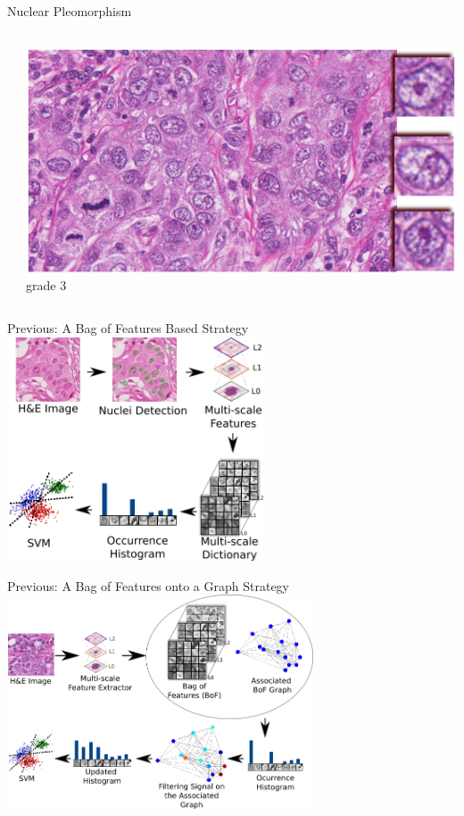 \documentclass[usenames,dvipsnames]{beamer}
\begin{document}
\begin{frame}{Nuclear Pleomorphism}
{\begin{columns}
\begin{column}{0.33\textwidth}
\end{column}

\begin{column}{0.33\textwidth}
\includegraphics[width=\textwidth]{imagenes/grado3.png}
\\\centering \scriptsize grade 3

\end{column}

\end{columns}
      
  }
\end{frame}


\begin{frame}{Previous: A Bag of Features Based Strategy }
\centering\includegraphics[width=0.57\textwidth]{imagenes/metodo_sustentacion.png}
\end{frame}
\begin{frame}{Previous: A Bag of Features onto a Graph Strategy}
\centering\includegraphics[width=0.68\textwidth]{imagenes/metodo_sipaim2017.png}
\end{frame}
\end{document}

